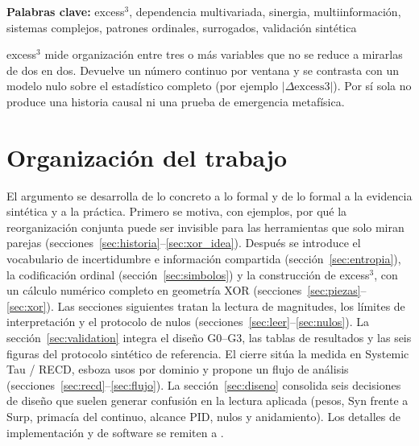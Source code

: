 \documentclass[11pt,a4paper]{article}
\begin{document}
\begin{abstract}
El presente trabajo motiva la medida con ejemplos, introduce el vocabulario
de incertidumbre e informaci\'on compartida, construye excess$^3$ con un
c\'alculo num\'erico tipo XOR, integra las figuras y hallazgos del protocolo
sint\'etico, y delimita lo que la medida no afirma. La definici\'on can\'onica,
el protocolo de nulos y el checklist de reporte est\'an en el preprint de
m\'etodos \citep{Padilla2026excess3}; este texto desarrolla motivaci\'on,
lectura e interpretaci\'on con evidencia, sin redefinir el estad\'istico. El
marco Systemic Tau / RECD se cita donde orienta el uso de Level~3
\citep{Padilla2026framework}.
\end{abstract}

\noindent\textbf{Palabras clave:}
excess$^3$, dependencia multivariada, sinergia, multiinformaci\'on,
sistemas complejos, patrones ordinales, surrogados, validaci\'on sint\'etica

\vspace{0.35cm}

\begin{idea}
excess$^3$ mide organizaci\'on entre tres o m\'as variables que no se reduce
a mirarlas de dos en dos. Devuelve un n\'umero continuo por ventana y se
contrasta con un modelo nulo sobre el estad\'istico completo (por ejemplo
$|\Delta\mathrm{excess3}|$). Por s\'i sola no produce una historia causal ni
una prueba de emergencia metaf\'isica.
\end{idea}

\tableofcontents
\newpage

\section{Organizaci\'on del trabajo}
\label{sec:como}

El argumento se desarrolla de lo concreto a lo formal y de lo formal a la
evidencia sint\'etica y a la pr\'actica. Primero se motiva, con ejemplos, por
qu\'e la reorganizaci\'on conjunta puede ser invisible para las herramientas
que solo miran parejas (secciones~\ref{sec:historia}--\ref{sec:xor_idea}).
Despu\'es se introduce el vocabulario de incertidumbre e informaci\'on
compartida (secci\'on~\ref{sec:entropia}), la codificaci\'on ordinal
(secci\'on~\ref{sec:simbolos}) y la construcci\'on de excess$^3$, con un
c\'alculo num\'erico completo en geometr\'ia XOR
(secciones~\ref{sec:piezas}--\ref{sec:xor}). Las secciones siguientes tratan
la lectura de magnitudes, los l\'imites de interpretaci\'on y el protocolo de
nulos (secciones~\ref{sec:leer}--\ref{sec:nulos}). La
secci\'on~\ref{sec:validation} integra el dise\~no G0--G3, las tablas de
resultados y las seis figuras del protocolo sint\'etico de referencia. El
cierre sit\'ua la medida en Systemic Tau / RECD, esboza usos por dominio y
propone un flujo de an\'alisis (secciones~\ref{sec:recd}--\ref{sec:flujo}).
La secci\'on~\ref{sec:diseno} consolida seis decisiones de dise\~no que
suelen generar confusi\'on en la lectura aplicada (pesos, Syn frente a Surp,
primac\'ia del continuo, alcance PID, nulos y anidamiento). Los detalles de
implementaci\'on y de software se remiten a \citep{Padilla2026excess3}.
\end{document}

